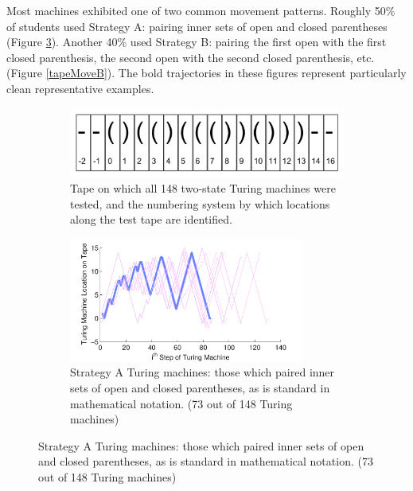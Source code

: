 Most machines exhibited one of two common movement patterns. Roughly 50\% of students used Strategy A: pairing inner sets of open and closed parentheses (Figure \ref{tapeMoveA}). Another 40\% used Strategy B: pairing the first open with the first closed parenthesis, the second open with the second closed parenthesis, etc. (Figure \ref{tapeMoveB}). The bold trajectories in these figures represent particularly clean representative examples.

\begin{figure}[p]

\begin{subfigure}[b]{1.0\textwidth}
\centering
\includegraphics[width=140mm]{Body/figures/ICERtapeLocations.png}
\caption{Tape on which all 148 two-state Turing machines were tested, and the numbering system by which locations along the test tape are identified.}
\label{tapeLocations}
\end{subfigure}

\begin{subfigure}[b]{1.0\textwidth}
\centering
\includegraphics[width=0.85\textwidth]{Body/figures/tmvisualization_InnerParensMatched_allkidsAnno2}
\caption{Strategy A Turing machines: those which paired inner sets of open and closed parentheses, as is standard in mathematical notation. (73 out of 148 Turing machines)}
\label{tapeMoveA}
\end{subfigure}


\end{figure}
